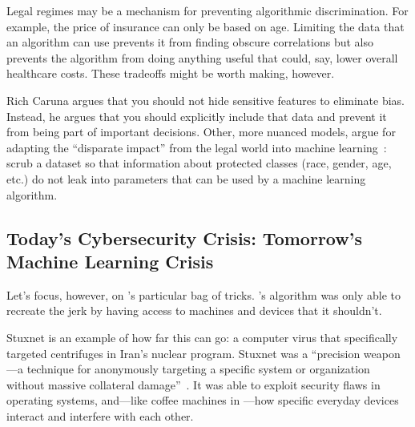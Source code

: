 
Legal regimes may be a mechanism for preventing algorithmic
discrimination.  For example, the price of insurance can only be based
on age.  Limiting the data that an algorithm can use prevents it from
finding obscure correlations but also prevents the algorithm from
doing anything useful that could, say, lower overall healthcare costs.
These tradeoffs might be worth making, however.

Rich Caruna argues that you should not hide sensitive features to
eliminate bias.  Instead, he argues that you should explicitly include
that data and prevent it from being part of important decisions.
Other, more nuanced models, argue for adapting the ``disparate
impact'' from the legal world into machine learning~\citep{feldman-15}:
scrub a dataset so that information about protected classes (race,
gender, age, etc.) do not leak into parameters that can be used by a
machine learning algorithm.

\subsection{Today's Cybersecurity Crisis: Tomorrow's Machine Learning Crisis}

Let's focus, however, on \energyJerk{}'s particular bag of tricks.
\energyCompany{}'s algorithm was only able to recreate the jerk by
having access to machines and devices that it shouldn't.

Stuxnet is an example of how far this can go: a computer virus that
specifically targeted centrifuges in Iran's nuclear program.
%
Stuxnet
was a ``precision weapon---a technique for anonymously targeting a
specific system or organization without massive collateral
damage''~\citep{lachow-11}.
%
It was able to exploit security flaws in operating systems, and---like
coffee machines in \crunchyCity{}---how specific everyday devices
interact and interfere with each other.

